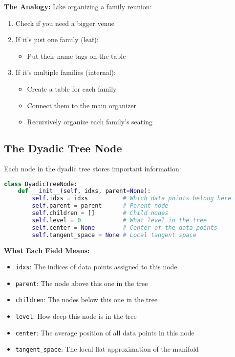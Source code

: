 \documentclass[12pt]{article}
\begin{document}
\textbf{The Analogy:} Like organizing a family reunion:
\begin{enumerate}
    \item Check if you need a bigger venue
    \item If it's just one family (leaf):
    \begin{itemize}
        \item Put their name tags on the table
    \end{itemize}
    \item If it's multiple families (internal):
    \begin{itemize}
        \item Create a table for each family
    \item Connect them to the main organizer
    \item Recursively organize each family's seating
    \end{itemize}
\end{enumerate}

\subsection{The Dyadic Tree Node}

Each node in the dyadic tree stores important information:

\begin{lstlisting}[language=Python, basicstyle=\small]
class DyadicTreeNode:
    def __init__(self, idxs, parent=None):
        self.idxs = idxs          # Which data points belong here
        self.parent = parent      # Parent node
        self.children = []        # Child nodes
        self.level = 0            # What level in the tree
        self.center = None        # Center of the data points
        self.tangent_space = None # Local tangent space
\end{lstlisting}

\textbf{What Each Field Means:}
\begin{itemize}
    \item \texttt{idxs}: The indices of data points assigned to this node
    \item \texttt{parent}: The node above this one in the tree
    \item \texttt{children}: The nodes below this one in the tree
    \item \texttt{level}: How deep this node is in the tree
    \item \texttt{center}: The average position of all data points in this node
    \item \texttt{tangent\_space}: The local flat approximation of the manifold
\end{itemize}
\end{document}
